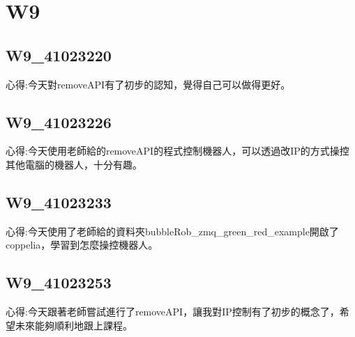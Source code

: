 \chapter{W9}


\section{W9\_41023220}

心得:今天對removeAPI有了初步的認知，覺得自己可以做得更好。

\section{W9\_41023226}

心得:今天使用老師給的removeAPI的程式控制機器人，可以透過改IP的方式操控其他電腦的機器人，十分有趣。

\section{W9\_41023233}

心得:今天使用了老師給的資料夾bubbleRob_zmq\_green\_red\_example開啟了coppelia，學習到怎麼操控機器人。

\section{W9\_41023253}

心得:今天跟著老師嘗試進行了removeAPI，讓我對IP控制有了初步的概念了，希望未來能夠順利地跟上課程。

